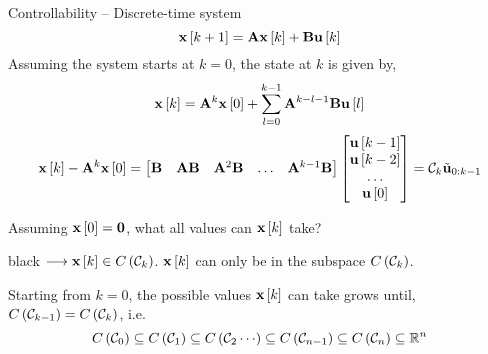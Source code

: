 \documentclass[aspectratio=169]{beamer}
\def\mf{\ensuremath\mathbf}
\def\mb{\ensuremath\mathbb}
\def\lp{\ensuremath\left(}
\def\rp{\ensuremath\right)}
\def\ls{\ensuremath\left[}
\def\rs{\ensuremath\right]}
\def\bmx{\ensuremath\begin{bmatrix*}[r]}
\def\emx{\ensuremath\end{bmatrix*}}
\def\bmxc{\ensuremath\begin{bmatrix*}[c]}
\newcommand{\demoexc}[3]{\onslide<#1->\begin{color}{#2} #3 \end{color}}
\newcommand{\ct}[1]{\lp #1\rp}
\newcommand{\dt}[1]{\ls #1\rs}
\begin{document}
\begin{frame}{Controllability -- Discrete-time system}
\vspace{-0.2cm}
\[ \mf{x}\dt{k+1} = \mf{A}\mf{x}\dt{k} + \mf{B}\mf{u}\dt{k} \]
Assuming the system starts at $k=0$, the state at $k$ is given by,\vspace{-0.15cm}
\[ \mf{x}\dt{k} = \mf{A}^{k}\mf{x}\dt{0} + \sum_{l=0}^{k-1} \mf{A}^{k-l-1}\mf{B}\mf{u}\dt{l} \]\vspace{-0.15cm}
\[ \mf{x}\dt{k} - \mf{A}^{k}\mf{x}\dt{0} = \bmx \mf{B} & \mf{A}\mf{B} & \mf{A}^2\mf{B} & \ldots & \mf{A}^{k-1}\mf{B} \emx \bmxc \mf{u}\dt{k-1} \\ \mf{u}\dt{k-2} \\ \ldots \\ \mf{u}\dt{0} \emx = \mathcal{C}_k \tilde{\mf{u}}_{0:k-1} \]
\vspace{0.1cm}

Assuming $\mf{x}\dt{0} = \mf{0}$, what all values can $\mf{x}\dt{k}$ take? \demoexc{2}{black}{ $\longrightarrow \mf{x}\dt{k} \in C\ct{\mathcal{C}_k}$. $\mf{x}\dt{k}$ can only be in the subspace $C\ct{\mathcal{C}_k}$.
\vspace{0.1cm}

Starting from $k=0$, the possible values $\mf{x}\dt{k}$ can take grows until, $C\ct{\mathcal{C}_{k-1}} = C\ct{\mathcal{C}_{k}}$, i.e.
\[ C\ct{\mathcal{C}_0} \subseteq C\ct{\mathcal{C}_1} \subseteq C\ct{\mathcal{C}_2 \cdots} \subseteq C\ct{\mathcal{C}_{n-1}} \subseteq C\ct{\mathcal{C}_{n}} \subseteq \mb{R}^n \]
}
\end{frame}
 
\end{document}
